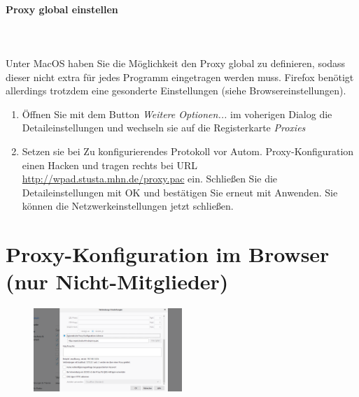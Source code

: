 \documentclass[a4paper,12pt]{scrartcl}
\begin{document}
\paragraph*{Proxy global einstellen}~\\
\\
Unter MacOS haben Sie die Möglichkeit den Proxy global zu definieren, sodass dieser nicht extra für jedes Programm eingetragen werden muss. Firefox benötigt allerdings trotzdem eine gesonderte Einstellungen (siehe Browsereinstellungen). %

\begin{enumerate}%
    \item Öffnen Sie mit dem Button \emph{Weitere Optionen...} im voherigen Dialog die Detaileinstellungen und wechseln sie auf die Registerkarte \emph{Proxies}
    \item Setzen sie bei Zu konfigurierendes Protokoll vor Autom. Proxy-Konfiguration einen Hacken und tragen rechts bei URL \url{http://wpad.stusta.mhn.de/proxy.pac} ein. Schließen Sie die Detaileinstellungen mit OK und bestätigen Sie erneut mit Anwenden. Sie können die Netzwerkeinstellungen jetzt schließen.
\end{enumerate}

\newpage

\section*{Proxy-Konfiguration im Browser (nur Nicht-Mitglieder)}
\label{Proxy}

\begin{figure}
	\vspace{-40pt}
	\begin{center}
		\includegraphics[width=0.5\textwidth,keepaspectratio]{Bilder/Firefox_neu_proxy}
	\end{center}
\end{figure}
\end{document}
